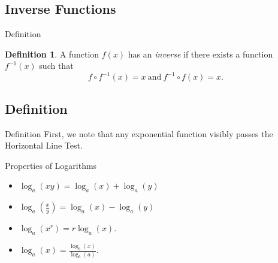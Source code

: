 \documentclass{beamer}
\newtheorem{thm}{Theorem}
\theoremstyle{definition}
\newtheorem{defn}{Definition}
\newtheorem{rmk}{Remark}
\begin{document}
\subsection{Inverse Functions}

\begin{frame}{Definition}
  \begin{defn}
    A function $f(x)$ has an {\it inverse} if there exists a function $f^{-1}(x)$ such that
    $$f \circ f^{-1}(x) = x\ \text{and}\ f^{-1} \circ f(x) = x.$$
  \end{defn}
  
\end{frame}

\subsection{Definition}

\begin{frame}{Definition}
  First, we note that any exponential function visibly passes the Horizontal Line Test.
\end{frame}

\begin{frame}{Properties of Logarithms}
\begin{itemize}
  \item<1->
    $\log_a(xy) = \log_a(x) + \log_a(y)$
  \item<2->
    $\log_a\left(\frac{x}{y}\right) = \log_a(x) - \log_a(y)$
  \item<3->
    $\log_a\left(x^r\right) = r\log_a(x)$.
  \item<4->
    $\log_a(x) = \frac{\log_b(x)}{\log_b(a)}$.
\end{itemize}
\end{frame}
\end{document}
